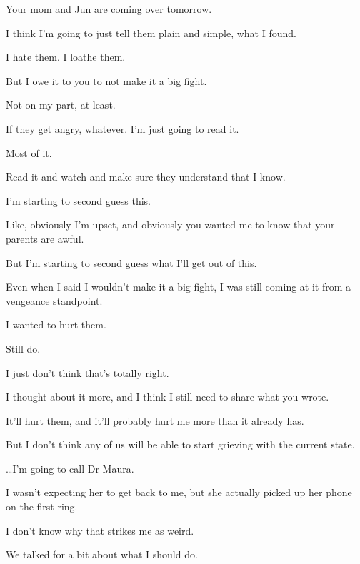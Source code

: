 { Your mom and Jun are coming over tomorrow.

 I think I'm going to just tell them plain and simple, what I found.

 I hate them. I loathe them.

 But I owe it to you to not make it a big fight.

 Not on my part, at least.

 If they get angry, whatever. I'm just going to read it.

 Most of it.

 Read it and watch and make sure they understand that I know.

 I'm starting to second guess this.

 Like, obviously I'm upset, and obviously you wanted me to know that your parents are awful.

 But I'm starting to second guess what I'll get out of this.

 Even when I said I wouldn't make it a big fight, I was still coming at it from a vengeance standpoint.

 I wanted to hurt them.

 Still do.

 I just don't think that's totally right.

 I thought about it more, and I think I still need to share what you wrote.

 It'll hurt them, and it'll probably hurt me more than it already has.

 But I don't think any of us will be able to start grieving with the current state.

\ldots{}I'm going to call Dr Maura.

 I wasn't expecting her to get back to me, but she actually picked up her phone on the first ring.

 I don't know why that strikes me as weird.

 We talked for a bit about what I should do.

}
